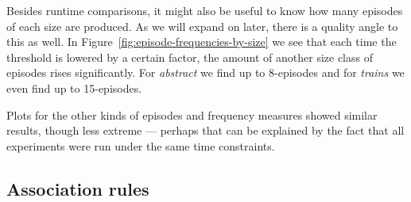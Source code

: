 Besides runtime comparisons, it might also be useful to know how many episodes of each size are produced. As we will expand on later, there is a quality angle to this as well. In Figure~\ref{fig:episode-frequencies-by-size} we see that each time the threshold is lowered by a certain factor, the amount of another size class of episodes rises significantly. For \emph{abstract} we find up to 8-episodes and for \emph{trains} we even find up to 15-episodes.

Plots for the other kinds of episodes and frequency measures showed similar results, though less extreme --- perhaps that can be explained by the fact that all experiments were run under the same time constraints.


\subsection{Association rules}
\label{sec:performance-rules}


